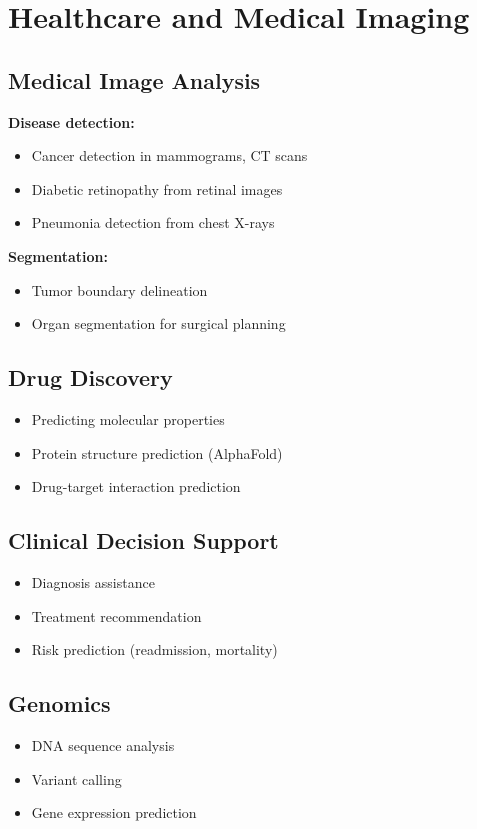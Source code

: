 
\section{Healthcare and Medical Imaging}
\label{sec:healthcare-applications}

\subsection{Medical Image Analysis}

\textbf{Disease detection:}
\begin{itemize}
    \item Cancer detection in mammograms, CT scans
    \item Diabetic retinopathy from retinal images
    \item Pneumonia detection from chest X-rays
\end{itemize}

\textbf{Segmentation:}
\begin{itemize}
    \item Tumor boundary delineation
    \item Organ segmentation for surgical planning
\end{itemize}

\subsection{Drug Discovery}

\begin{itemize}
    \item Predicting molecular properties
    \item Protein structure prediction (AlphaFold)
    \item Drug-target interaction prediction
\end{itemize}

\subsection{Clinical Decision Support}

\begin{itemize}
    \item Diagnosis assistance
    \item Treatment recommendation
    \item Risk prediction (readmission, mortality)
\end{itemize}

\subsection{Genomics}

\begin{itemize}
    \item DNA sequence analysis
    \item Variant calling
    \item Gene expression prediction
\end{itemize}


